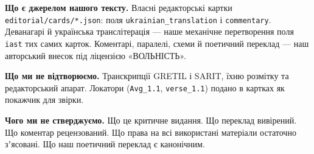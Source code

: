 \documentclass[10pt,a5paper,openany]{book}
\begin{document}
\noindent\textbf{\sffamily Що є джерелом нашого тексту.}
Власні редакторські картки \texttt{editorial/cards/*.json}: поля
\texttt{ukrainian\_translation} і \texttt{commentary}. Деванагарі й українська
транслітерація — наше механічне перетворення поля \texttt{iast} тих самих
карток. Коментарі, паралелі, схеми й поетичний переклад — наш авторський
внесок під ліцензією «ВОЛЬНІСТЬ».

\vspace{0.6em}
\noindent\textbf{\sffamily Що ми не відтворюємо.}
Транскрипції GRETIL і SARIT, їхню розмітку та редакторський апарат. Локатори
(\texttt{Avg\_1.1}, \texttt{verse\_1.1}) подано в картках як покажчик для звірки.

\vspace{0.6em}
\noindent\textbf{\sffamily Чого ми не стверджуємо.}
Що це критичне видання. Що переклад вивірений. Що коментар рецензований. Що
права на всі використані матеріали остаточно зʼясовані. Що наш поетичний
переклад є канонічним.
\end{document}
